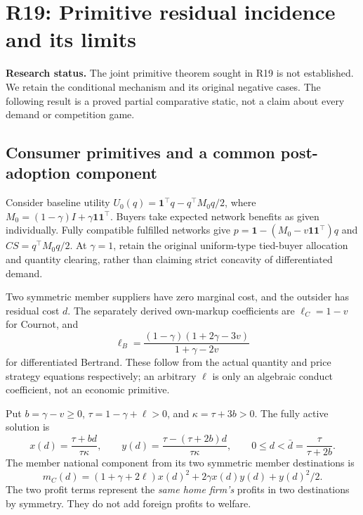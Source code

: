 \section{R19: Primitive residual incidence and its limits}
\label{sec:r19-partial}
\noindent\textbf{Research status.} The joint primitive theorem sought in
R19 is not established. We retain the conditional mechanism and its
original negative cases. The following result is a proved partial
comparative static, not a claim about every demand or competition game.

\subsection{Consumer primitives and a common post-adoption component}
Consider baseline utility
\(U_0(q)=\mathbf1^\top q-q^\top M_0q/2\), where
\(M_0=(1-\gamma)I+\gamma\mathbf1\mathbf1^\top\).
Buyers take expected network benefits as given individually. Fully
compatible fulfilled networks give
\(p=\mathbf1-(M_0-v\mathbf1\mathbf1^\top)q\) and
\(CS=q^\top M_0q/2\). At \(\gamma=1\), retain the original
uniform-type tied-buyer allocation and quantity clearing, rather than
claiming strict concavity of differentiated demand.

Two symmetric member suppliers have zero marginal cost, and the outsider
has residual cost \(d\). The separately derived own-markup coefficients
are \(\ell_C=1-v\) for Cournot, and
\[
\ell_B=\frac{(1-\gamma)(1+2\gamma-3v)}{1+\gamma-2v}
\]
for differentiated Bertrand. These follow from the actual quantity and
price strategy equations respectively; an arbitrary \(\ell\) is only an
algebraic conduct coefficient, not an economic primitive.

Put \(b=\gamma-v\ge0\), \(\tau=1-\gamma+\ell>0\), and
\(\kappa=\tau+3b>0\). The fully active solution is
\[
x(d)=\frac{\tau+bd}{\tau\kappa},\qquad
 y(d)=\frac{\tau-(\tau+2b)d}{\tau\kappa},\qquad
0\le d<\bar d=\frac{\tau}{\tau+2b}.
\]
The member national component from its two symmetric member destinations
is
\[
m_C(d)=(1+\gamma+2\ell)x(d)^2+2\gamma x(d)y(d)+y(d)^2/2.
\]
The two profit terms represent the \emph{same home firm's} profits in
two destinations by symmetry. They do not add foreign profits to welfare.

